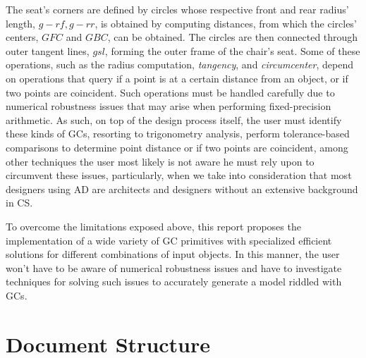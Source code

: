 The seat's corners are defined by circles whose respective front and rear
radius' length, $g-rf,g-rr$, is obtained by computing distances, from which the
circles' centers, $GFC$ and $GBC$, can be obtained.  The circles are then
connected through outer tangent lines, $gsl$, forming the outer frame of the
chair's seat.  Some of these operations, such as the radius computation,
\textit{tangency}, and \textit{circumcenter}, depend on operations that query if
a point is at a certain distance from an object, or if two points are
coincident.  Such operations must be handled carefully due to numerical
robustness issues that may arise when performing fixed-precision arithmetic.  As
such, on top of the design process itself, the user must identify these kinds of
\acp{GC}, resorting to trigonometry analysis, perform tolerance-based
comparisons to determine point distance or if two points are coincident, among
other techniques the user most likely is not aware he must rely upon to
circumvent these issues, particularly, when we take into consideration that most
designers using \ac{AD} are architects and designers without an extensive
background in \ac{CS}.

To overcome the limitations exposed above, this report proposes the
implementation of a wide variety of \ac{GC} primitives with
specialized efficient solutions for different combinations of input objects.  In
this manner, the user won't have to be aware of numerical robustness issues and
have to investigate techniques for solving such issues to accurately generate a
model riddled with \acp{GC}.

\section{Document Structure}
\label{sec:intro.structure}

